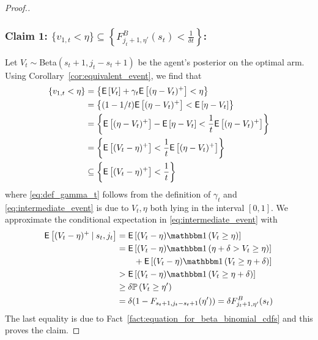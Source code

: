 \begin{proof}[Proof.]
	\subsubsection*{Claim 1: $\{v_{1,t} < \eta\} \subseteq \left\{F^B_{j_t+1, \eta'}(s_t) < \frac{1}{\delta t}\right\}$:}
	Let $V_t \sim $Beta$(s_t+1,j_t - s_t + 1)$ be the agent's posterior on the optimal arm. Using Corollary~\ref{cor:equivalent_event}, we find that
	\begin{align}
	\left\{v_{1,t} < \eta \right\} & = \left\{ \mathsf{E} \left[ V_t  \right] + \gamma_t\mathsf{E} \left[ (\eta - V_t)^+ \right] < \eta \right\} \nonumber\\
	& =  \left\{ (1-1/t)\mathsf{E} \left[ (\eta - V_t)^+ \right] < \mathsf{E} \left[ \eta - V_t \right] \right\} \label{eq:def_gamma_t} \\
	& =  \left\{ \mathsf{E} \left[ (\eta - V_t)^+ \right] - \mathsf{E} \left[ \eta - V_t \right] <  \frac{1}{t}\mathsf{E} \left[ (\eta - V_t)^+ \right]\right\} \nonumber\\
	& =  \left\{ \mathsf{E} \left[ (V_t - \eta)^+ \right]<  \frac{1}{t}\mathsf{E} \left[ (\eta - V_t)^+ \right]\right\} \nonumber\\
	& \subseteq \left\{ \mathsf{E} \left[  (V_t - \eta)^+ \right]< \frac{1}{t}  \right\}  \label{eq:intermediate_event}
	\end{align}
	where \eqref{eq:def_gamma_t} follows from the definition of $\gamma_t$ and \eqref{eq:intermediate_event} is due to $V_t, \eta$ both lying in the interval $[0,1]$. We approximate the conditional expectation in \eqref{eq:intermediate_event} with
	\begin{align}
	\Ee{(V_t - \eta)^+ \given s_t, j_t} & = \Ee{(V_t - \eta) \ind{V_t \ge \eta} }\nonumber \\
	& = \Ee{(V_t - \eta) \ind{\eta + \delta > V_t \ge \eta} }  \nonumber \\
	& \qquad + \Ee{(V_t - \eta) \ind{ V_t \ge \eta + \delta} } \nonumber \\
	& > \Ee{(V_t - \eta) \ind{ V_t \ge \eta + \delta} } \nonumber \\
	& \ge \delta\P{ V_t \ge \eta' } \nonumber \\
	& = \delta (1 - F_{s_t+1,j_t-s_t+1}(\eta')) = \delta F^B_{j_t+1,\eta'}(s_t) \label{ineq:lower_bound_on_ppart_term}
	\end{align}
	The last equality is due to Fact~\ref{fact:equation_for_beta_binomial_cdfs} and this proves the claim.

\end{proof}
